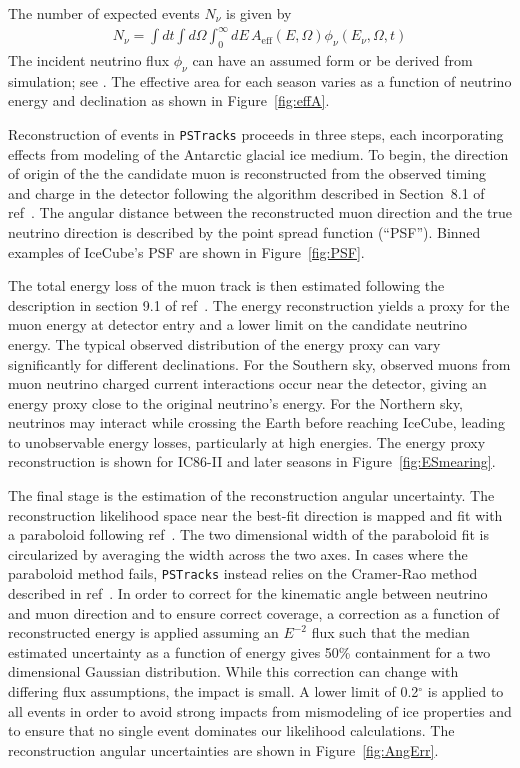 \documentclass[aps,10pt,prd,twocolumn,floats,letterpaper,showpacs,nofootinbib,bibnotes,notitlepage,superscriptaddress,floatfix]{revtex4-1}
\begin{document}
The number of expected events $N_\nu$ is given by 
\begin{align}\label{eq:ev_rate}
N_\nu=\int dt \int d\Omega\int_0^\infty dE\,A_\mathrm{eff}\left(E, \Omega\right) \phi_\nu\left(E_\nu,\Omega, t\right)
\end{align}
The incident neutrino flux $\phi_\nu$ can have an assumed form or be derived from simulation; see \cite{Aartsen:2016xlq}. The effective area for each season varies as a function of neutrino energy and declination as shown in Figure~\ref{fig:effA}.

Reconstruction of events in {\tt PSTracks} proceeds in three steps, each incorporating effects from modeling of the Antarctic glacial ice medium. To begin, the direction of origin of the the candidate muon is reconstructed from the observed timing and charge in the detector following the algorithm described in Section~8.1 of ref~\cite{Ahrens:2004direc}. The angular distance between the reconstructed muon direction and the true neutrino direction is described by the point spread function (``PSF''). Binned examples of IceCube's PSF are shown in Figure~\ref{fig:PSF}.

The total energy loss of the muon track is then estimated following the description in section 9.1 of ref~\cite{Aartsen:2014erec}. The energy reconstruction yields a proxy for the muon energy at detector entry and a lower limit on the candidate neutrino energy. The typical observed distribution of the energy proxy can vary significantly for different declinations. For the Southern sky, observed muons from muon neutrino charged current interactions occur near the detector, giving an energy proxy close to the original neutrino's energy. For the Northern sky, neutrinos may interact while crossing the Earth before reaching IceCube, leading to unobservable energy losses, particularly at high energies. The energy proxy reconstruction is shown for IC86-II and later seasons in Figure~\ref{fig:ESmearing}.

The final stage is the estimation of the reconstruction angular uncertainty. The reconstruction likelihood space near the best-fit direction is mapped and fit with a paraboloid following ref~\cite{Neunhoeffer:2006}. The two dimensional width of the paraboloid fit is circularized by averaging the width across the two axes. In cases where the paraboloid method fails, {\tt PSTracks} instead relies on the Cramer-Rao method described in ref~\cite{Lunemann:2013oya}. In order to correct for the kinematic angle between neutrino and muon direction and to ensure correct coverage, a correction as a function of reconstructed energy is applied assuming an $E^{-2}$ flux such that the median estimated uncertainty as a function of energy gives 50\% containment for a two dimensional Gaussian distribution. While this correction can change with differing flux assumptions, the impact is small. A lower limit of 0.2$^\circ$ is applied to all events in order to avoid strong impacts from mismodeling of ice properties and to ensure that no single event dominates our likelihood calculations. The reconstruction angular uncertainties are shown in Figure~\ref{fig:AngErr}.
\end{document}
